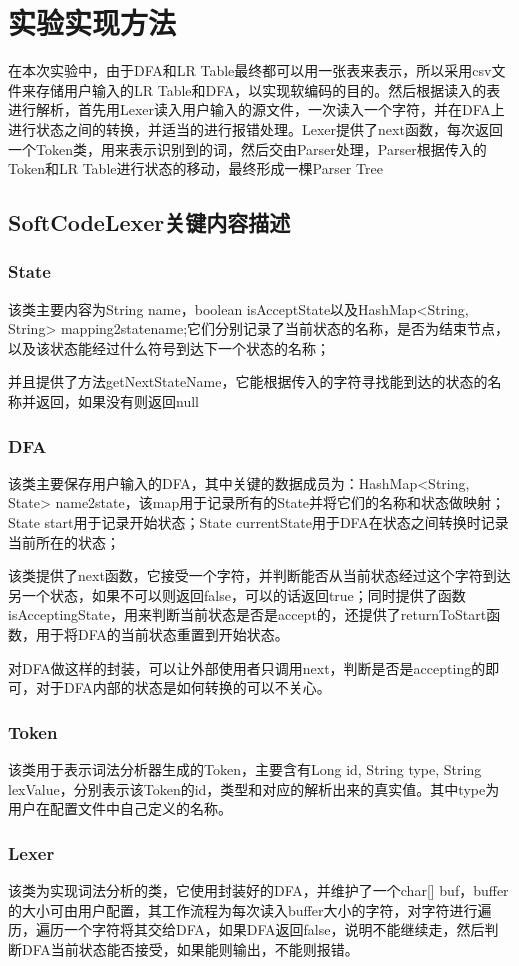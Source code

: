 \section{实验实现方法}
在本次实验中，由于DFA和LR Table最终都可以用一张表来表示，所以采用csv文件来存储用户输入的LR Table和DFA，以实现软编码的目的。然后根据读入的表进行解析，首先用Lexer读入用户输入的源文件，一次读入一个字符，并在DFA上进行状态之间的转换，并适当的进行报错处理。Lexer提供了next函数，每次返回一个Token类，用来表示识别到的词，然后交由Parser处理，Parser根据传入的Token和LR Table进行状态的移动，最终形成一棵Parser Tree
\subsection{SoftCodeLexer关键内容描述}
\subsubsection{State}
该类主要内容为String name，boolean isAcceptState以及HashMap<String, String> mapping2statename;它们分别记录了当前状态的名称，是否为结束节点，以及该状态能经过什么符号到达下一个状态的名称；


并且提供了方法getNextStateName，它能根据传入的字符寻找能到达的状态的名称并返回，如果没有则返回null
\subsubsection{DFA}
该类主要保存用户输入的DFA，其中关键的数据成员为：HashMap<String, State> name2state，该map用于记录所有的State并将它们的名称和状态做映射；State start用于记录开始状态；State currentState用于DFA在状态之间转换时记录当前所在的状态；


该类提供了next函数，它接受一个字符，并判断能否从当前状态经过这个字符到达另一个状态，如果不可以则返回false，可以的话返回true；同时提供了函数isAcceptingState，用来判断当前状态是否是accept的，还提供了returnToStart函数，用于将DFA的当前状态重置到开始状态。


对DFA做这样的封装，可以让外部使用者只调用next，判断是否是accepting的即可，对于DFA内部的状态是如何转换的可以不关心。

\subsubsection{Token}
该类用于表示词法分析器生成的Token，主要含有Long id, String type, String lexValue，分别表示该Token的id，类型和对应的解析出来的真实值。其中type为用户在配置文件中自己定义的名称。
\subsubsection{Lexer}
该类为实现词法分析的类，它使用封装好的DFA，并维护了一个char[] buf，buffer的大小可由用户配置，其工作流程为每次读入buffer大小的字符，对字符进行遍历，遍历一个字符将其交给DFA，如果DFA返回false，说明不能继续走，然后判断DFA当前状态能否接受，如果能则输出，不能则报错。

